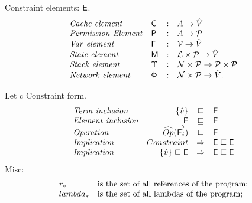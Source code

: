 Constraint elements: $\mathsf{E}$.
\[
\begin{array}{llcl}
\mathit{Cache\ element}      & \mathsf{C}   & : & A \rightarrow \hat{V} \\
\mathit{Permission\ Element} & \mathsf{P}   & : & A \rightarrow \mathcal{P}\\
\mathit{Var\ element}        & \mathsf{\Gamma}   & : & \mathcal{V} \rightarrow \hat{V} \\
\mathit{State\ element}      & \mathsf{M}   & : & {\mathcal L} \times \mathcal{P} \rightarrow \hat{V} \\
\mathit{Stack\ element}      & \mathsf{\Upsilon} & : & \mathcal{N} \times \mathcal{P} \rightarrow \mathcal{P} \times \mathcal{P} \\
\mathit{Network\ element}    & \mathsf{\Phi} & : & \mathcal{N} \times \mathcal{P} \rightarrow \hat{V}.
\end{array}
\]

Let c 
Constraint form.
\[
\begin{array}{lrcl}
\mathit{Term\ inclusion} & \{\hat{v}\} & \sqsubseteq & \mathsf{E} \\
\mathit{Element\ inclusion} & \mathsf{E} & \sqsubseteq & \mathsf{E} \\
\mathit{Operation} & \widehat{Op}(\overrightarrow{\mathsf{E}_i}) & \sqsubseteq & \mathsf{E} \\
\mathit{Implication} & Constraint & \Rightarrow & \mathsf{E} \sqsubseteq \mathsf{E} \\

\mathit{Implication} & \{\hat{v}\} \sqsubseteq \mathsf{E} & \Rightarrow & \mathsf{E} \sqsubseteq \mathsf{E} \\

\end{array}
\]
Misc:
\[
\begin{array}{l l}
r_* & $is the set of all references of the program;$\\
lambda_* & $is the set of all lambdas of the program;$\\
\end{array}
\]

